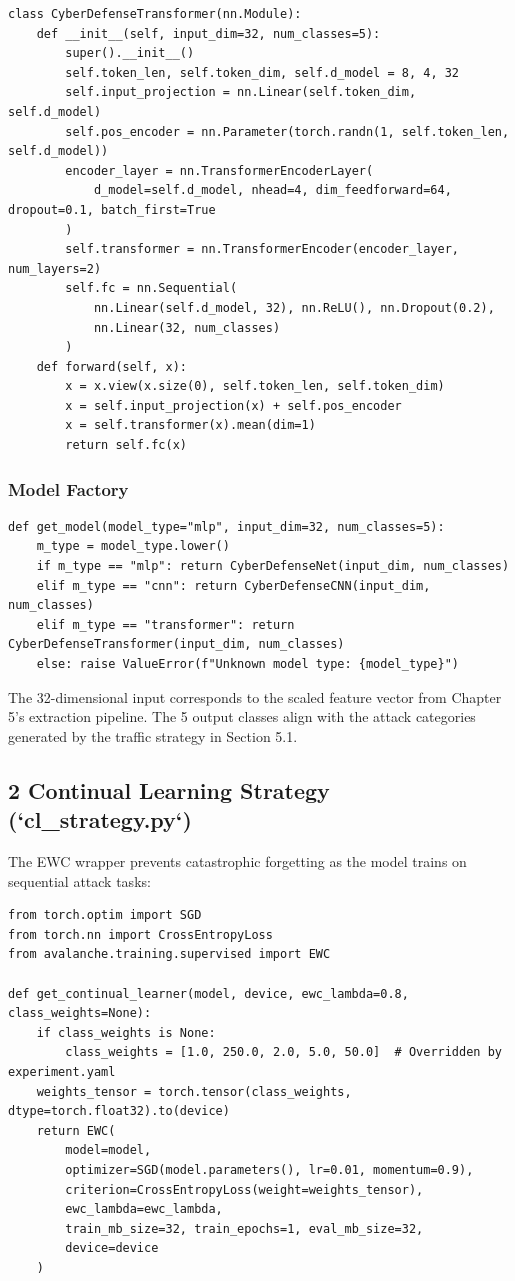 \documentclass[conference]{IEEEtran}
\begin{document}
\begin{verbatim}
class CyberDefenseTransformer(nn.Module):
    def __init__(self, input_dim=32, num_classes=5):
        super().__init__()
        self.token_len, self.token_dim, self.d_model = 8, 4, 32
        self.input_projection = nn.Linear(self.token_dim, self.d_model)
        self.pos_encoder = nn.Parameter(torch.randn(1, self.token_len, self.d_model))
        encoder_layer = nn.TransformerEncoderLayer(
            d_model=self.d_model, nhead=4, dim_feedforward=64, dropout=0.1, batch_first=True
        )
        self.transformer = nn.TransformerEncoder(encoder_layer, num_layers=2)
        self.fc = nn.Sequential(
            nn.Linear(self.d_model, 32), nn.ReLU(), nn.Dropout(0.2),
            nn.Linear(32, num_classes)
        )
    def forward(self, x):
        x = x.view(x.size(0), self.token_len, self.token_dim)
        x = self.input_projection(x) + self.pos_encoder
        x = self.transformer(x).mean(dim=1)
        return self.fc(x)
\end{verbatim}


\subsubsection{Model Factory}

\begin{verbatim}
def get_model(model_type="mlp", input_dim=32, num_classes=5):
    m_type = model_type.lower()
    if m_type == "mlp": return CyberDefenseNet(input_dim, num_classes)
    elif m_type == "cnn": return CyberDefenseCNN(input_dim, num_classes)
    elif m_type == "transformer": return CyberDefenseTransformer(input_dim, num_classes)
    else: raise ValueError(f"Unknown model type: {model_type}")
\end{verbatim}

The 32-dimensional input corresponds to the scaled feature vector from Chapter 5's extraction pipeline. The 5 output classes align with the attack categories generated by the traffic strategy in Section 5.1.


\subsection{2 Continual Learning Strategy (`cl_strategy.py`)}

The EWC wrapper prevents catastrophic forgetting as the model trains on sequential attack tasks:

\begin{verbatim}
from torch.optim import SGD
from torch.nn import CrossEntropyLoss
from avalanche.training.supervised import EWC

def get_continual_learner(model, device, ewc_lambda=0.8, class_weights=None):
    if class_weights is None:
        class_weights = [1.0, 250.0, 2.0, 5.0, 50.0]  # Overridden by experiment.yaml
    weights_tensor = torch.tensor(class_weights, dtype=torch.float32).to(device)
    return EWC(
        model=model,
        optimizer=SGD(model.parameters(), lr=0.01, momentum=0.9),
        criterion=CrossEntropyLoss(weight=weights_tensor),
        ewc_lambda=ewc_lambda,
        train_mb_size=32, train_epochs=1, eval_mb_size=32,
        device=device
    )
\end{verbatim}
\end{document}

